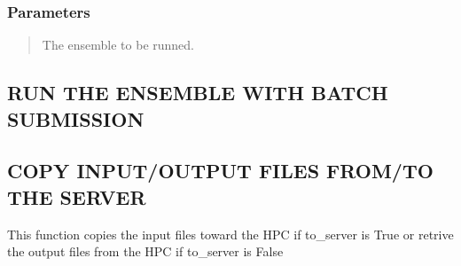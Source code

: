 \documentclass[a4paper,11pt,english]{sphinxmanual}
\begin{document}
\begin{fulllineitems}
\begin{fulllineitems}
\subsubsection{Parameters}
\label{\detokenize{apireference:id53}}\begin{quote}
\begin{description}
\sphinxAtStartPar
The ensemble to be runned.

\end{description}
\end{quote}

\end{fulllineitems}


\begin{fulllineitems}
\label{\detokenize{apireference:sscha.Cluster.Cluster.compute_ensemble_batch}}
\pysigstartsignatures
{}
\pysigstopsignatures

\subsection{RUN THE ENSEMBLE WITH BATCH SUBMISSION}
\label{\detokenize{apireference:run-the-ensemble-with-batch-submission}}
\end{fulllineitems}


\begin{fulllineitems}
\label{\detokenize{apireference:sscha.Cluster.Cluster.copy_files}}
\pysigstartsignatures
{}
\pysigstopsignatures

\subsection{COPY INPUT/OUTPUT FILES FROM/TO THE SERVER}
\label{\detokenize{apireference:copy-input-output-files-from-to-the-server}}
\sphinxAtStartPar
This function copies the input files toward the HPC if to\_server is True
or retrive the output files from the HPC if to\_server is False



\end{fulllineitems}
\end{fulllineitems}
\end{document}
